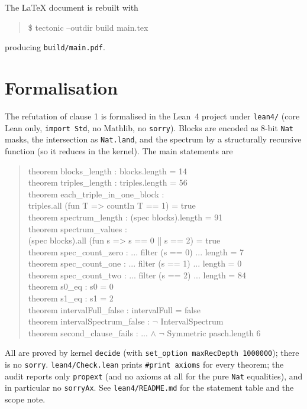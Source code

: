 \documentclass[11pt]{article}
\theoremstyle{definition}
\theoremstyle{remark}
\begin{document}
The LaTeX document is rebuilt with

\begin{quote}\ttfamily\raggedright
\$ tectonic --outdir build main.tex
\end{quote}

producing \texttt{build/main.pdf}.

\section{Formalisation}

The refutation of clause 1 is formalised in the Lean~4 project under
\texttt{lean4/} (core Lean only, \texttt{import Std}, no Mathlib, no
\texttt{sorry}). Blocks are encoded as $8$-bit \texttt{Nat} masks, the
intersection as \texttt{Nat.land}, and the spectrum by a structurally
recursive function (so it reduces in the kernel). The main statements are

\begin{quote}\ttfamily\raggedright
theorem blocks\_length : blocks.length = 14\\
theorem triples\_length : triples.length = 56\\
theorem each\_triple\_in\_one\_block :\\
\hspace*{2em}triples.all (fun T => countIn T == 1) = true\\
theorem spectrum\_length : (spec blocks).length = 91\\
theorem spectrum\_values :\\
\hspace*{2em}(spec blocks).all (fun s => s == 0 || s == 2) = true\\
theorem spec\_count\_zero : ... filter (s == 0) ... length = 7\\
theorem spec\_count\_one  : ... filter (s == 1) ... length = 0\\
theorem spec\_count\_two  : ... filter (s == 2) ... length = 84\\
theorem s0\_eq : s0 = 0\\
theorem s1\_eq : s1 = 2\\
theorem intervalFull\_false : intervalFull = false\\
theorem intervalSpectrum\_false : \(\neg\) IntervalSpectrum\\
theorem second\_clause\_fails : ... \(\wedge\) \(\neg\) Symmetric pasch.length 6
\end{quote}

All are proved by kernel \texttt{decide} (with
\texttt{set\_option maxRecDepth 1000000}); there is no \texttt{sorry}.
\texttt{lean4/Check.lean} prints \texttt{\#print axioms} for every theorem; the
audit reports only \texttt{propext} (and no axioms at all for the pure
\texttt{Nat} equalities), and in particular no \texttt{sorryAx}. See
\texttt{lean4/README.md} for the statement table and the scope note.
\end{document}
